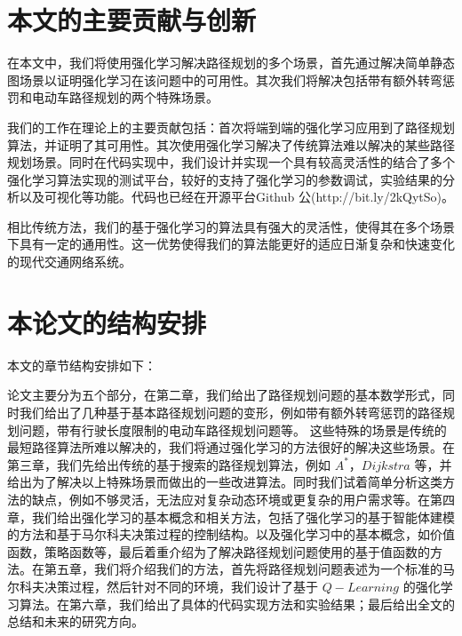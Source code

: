 \documentclass{standalone}
\begin{document}


\section{本文的主要贡献与创新} 
在本文中，我们将使用强化学习解决路径规划的多个场景，首先通过解决简单静态图场景以证明强化学习在该问题中的可用性。其次我们将解决包括带有额外转弯惩罚和电动车路径规划的两个特殊场景。\par
我们的工作在理论上的主要贡献包括：首次将端到端的强化学习应用到了路径规划算法，并证明了其可用性。其次使用强化学习解决了传统算法难以解决的某些路径规划场景。同时在代码实现中，我们设计并实现一个具有较高灵活性的结合了多个强化学习算法实现的测试平台，较好的支持了强化学习的参数调试，实验结果的分析以及可视化等功能。代码也已经在开源平台Github 公(http://bit.ly/2kQytSo)。\par
相比传统方法，我们的基于强化学习的算法具有强大的灵活性，使得其在多个场景下具有一定的通用性。这一优势使得我们的算法能更好的适应日渐复杂和快速变化的现代交通网络系统。
\section{本论文的结构安排}
本文的章节结构安排如下：\par
论文主要分为五个部分，在第二章，我们给出了路径规划问题的基本数学形式，同时我们给出了几种基于基本路径规划问题的变形，例如带有额外转弯惩罚的路径规划问题，带有行驶长度限制的电动车路径规划问题等。
这些特殊的场景是传统的最短路径算法所难以解决的，我们将通过强化学习的方法很好的解决这些场景。在第三章，我们先给出传统的基于搜索的路径规划算法，例如 $A^{*}$，$Dijkstra$ 等，并给出为了解决以上特殊场景而做出的一些改进算法。同时我们试着简单分析这类方法的缺点，例如不够灵活，无法应对复杂动态环境或更复杂的用户需求等。在第四章，我们给出强化学习的基本概念和相关方法，包括了强化学习的基于智能体建模的方法和基于马尔科夫决策过程的控制结构。以及强化学习中的基本概念，如价值函数，策略函数等，最后着重介绍为了解决路径规划问题使用的基于值函数的方法。在第五章，我们将介绍我们的方法，首先将路径规划问题表述为一个标准的马尔科夫决策过程，然后针对不同的环境，我们设计了基于 $Q-Learning$ 的强化学习算法。在第六章，我们给出了具体的代码实现方法和实验结果；最后给出全文的总结和未来的研究方向。
\end{document}
